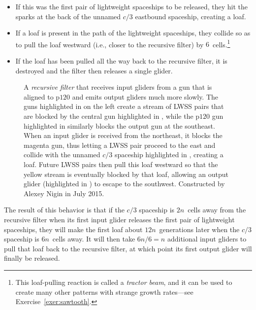 \begin{itemize}
	\item[1)] If this was the first pair of lightweight spaceships to be released, they hit the sparks at the back of the unnamed $c/3$ eastbound spaceship, creating a loaf.\smallskip
	
	\item[2)] If a loaf is present in the path of the lightweight spaceships, they collide so as to pull the loaf westward (i.e., closer to the recursive filter) by $6$~cells.\footnote{This loaf-pulling reaction is called a \emph{tractor beam}, and it can be used to create many other patterns with strange growth rates---see Exercise~\ref{exer:sawtooth}.}\smallskip
	
	\item[3)] If the loaf has been pulled all the way back to the recursive filter, it is destroyed and the filter then releases a single glider.\smallskip
\end{itemize}

\begin{figure}[!htb]
	\centering
	\caption{A \emph{recursive filter} that receives input gliders from a gun that is aligned to p$120$ and emits output gliders much more slowly. The guns highlighted in  on the left create a stream of LWSS pairs that are blocked by the central gun highlighted in , while the p$120$ gun highlighted in  similarly blocks the output gun at the southeast. When an input glider is received from the northeast, it blocks the magenta gun, thus letting a LWSS pair proceed to the east and collide with the unnamed $c/3$ spaceship highlighted in , creating a loaf. Future LWSS pairs then pull this loaf westward so that the yellow stream is eventually blocked by that loaf, allowing an output glider (highlighted in ) to escape to the southwest. Constructed by Alexey Nigin in July 2015.}\label{fig:recursive_filter}
\end{figure}

The result of this behavior is that if the $c/3$ spaceship is $2n$~cells away from the recursive filter when its first input glider releases the first pair of lightweight spaceships, they will make the first loaf about $12n$~generations later when the $c/3$ spaceship is $6n$~cells away. It will then take $6n/6 = n$ additional input gliders to pull that loaf back to the recursive filter, at which point its first output glider will finally be released.

